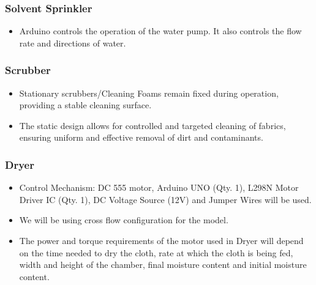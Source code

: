 \documentclass[table,french,english]{rapportCS}
\begin{document}
    \subsubsection*{Solvent Sprinkler}
        \begin{itemize}[label=$\bullet$]
        \item Arduino controls the operation of the water pump. It also controls the flow rate and directions of water.
        \end{itemize}
    \subsubsection*{Scrubber}
        \begin{itemize}[label=$\bullet$]
        \item Stationary scrubbers/Cleaning Foams remain fixed during operation, providing a stable cleaning surface. 
        \item The static design allows for controlled and targeted cleaning of fabrics, ensuring uniform and effective removal of dirt and contaminants. 
        \end{itemize}
    \subsubsection*{Dryer}
        \begin{itemize}[label=$\bullet$]
        \item Control Mechanism: DC 555 motor, Arduino UNO (Qty. 1), L298N Motor Driver IC (Qty. 1), DC Voltage Source (12V) and Jumper Wires will be used.
        \item We will be using cross flow configuration for the model.
        
        \item The power and torque requirements of the motor used in Dryer will depend on the time needed to dry the cloth, rate at which the cloth is being fed, width and height of the chamber, final moisture content and initial moisture content.
        \end{itemize}
        \clearpage
\end{document}
